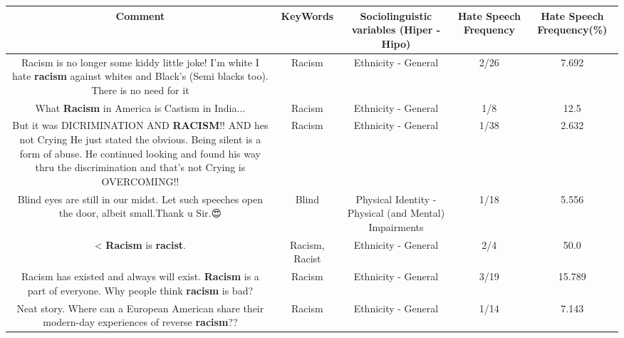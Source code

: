 \documentclass[11pt]{article}
\newlength\mylength
\begin{document}
\begin{center}
\setlength\mylength{\dimexpr\textwidth - 1\arrayrulewidth - 50\tabcolsep}
\begin{longtable}{|C{.65\mylength}|C{.30\mylength}|C{.12\mylength}|C{.12\mylength}|C{.12\mylength}|}
\hline
\textbf{Comment} & \textbf{KeyWords} & \textbf{Sociolinguistic variables (Hiper - Hipo)}  & \textbf{Hate Speech Frequency} & \textbf{Hate Speech Frequency(\%)} \\
\hline{}\small Racism is no longer some kiddy little joke! I'm white I hate \textbf{racism} against whites and Black's (Semi blacks too). There is no need for it\normalsize   & Racism & Ethnicity - General & 2/26 & 7.692 \\  \hline
  \small What \textbf{Racism} in America is Castism in India...\normalsize   & Racism & Ethnicity - General & 1/8 & 12.5 \\  \hline
  \small But it was DICRIMINATION AND \textbf{RACISM}!! AND hes not Crying He just stated the obvious. Being silent is a form of abuse. He continued looking and found his way thru the discrimination and that's not Crying is OVERCOMING!!\normalsize   & Racism & Ethnicity - General & 1/38 & 2.632 \\  \hline
  \small Blind eyes are still in our midst.  Let such speeches open the door, albeit small.Thank u Sir.😍\normalsize   & Blind & Physical Identity - Physical (and Mental) Impairments & 1/18 & 5.556 \\  \hline
  \small < \textbf{Racism} is \textbf{racist}.\normalsize   & Racism, Racist & Ethnicity - General & 2/4 & 50.0 \\  \hline
  \small Racism has existed and always will exist. \textbf{Racism} is a part of everyone. Why people think \textbf{racism} is bad?\normalsize   & Racism & Ethnicity - General & 3/19 & 15.789 \\  \hline
  \small Neat story. Where can a European American share their modern-day experiences of reverse \textbf{racism}??\normalsize   & Racism & Ethnicity - General & 1/14 & 7.143 \\  \hline

\end{longtable}
\end{center}
\end{document}
